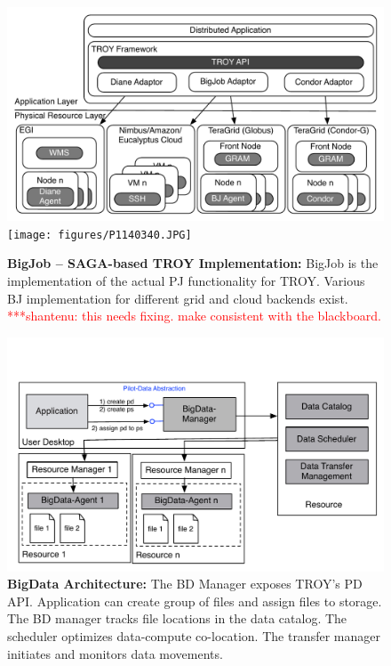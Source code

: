 \documentclass[conference,final]{IEEEtran}
\newcommand{\jhanote}[1]{ {\textcolor{red} { ***shantenu: #1 }}}
\newcommand{\jhanote}[1]{}
\newcommand{\up}{\vspace*{-1em}}
\begin{document}
\begin{figure}[t]
  \up\up\up
	\begin{minipage}[t]{0.475\linewidth}
	\centering
	\includegraphics[width=\textwidth]{figures/distributed_pilot_job.pdf}
	\texttt{[image: figures/P1140340.JPG]}
	\caption{\textbf{BigJob -- SAGA-based TROY Implementation:}
          BigJob is the implementation of the actual PJ functionality
          for TROY. Various BJ implementation for different grid and
          cloud backends exist. \jhanote{this needs fixing. make
            consistent with the blackboard.}}
	\label{fig:figures_distributed_pilot_job}
	\end{minipage}
	\hspace{0.035\linewidth}
	\begin{minipage}[t]{0.475\linewidth}
	\centering
   	\includegraphics[width=\textwidth]{figures/pilot-data-manager.pdf}
    \caption{\textbf{BigData Architecture:} The BD Manager exposes
      TROY's PD API. Application can create group of files and assign 
      files to storage. The BD manager tracks file locations in
      the data catalog. The scheduler optimizes data-compute co-location.
      The transfer manager initiates and monitors data movements. \up\up}
	\label{fig:pilot-data-architecture}
	\end{minipage}
\end{figure}
\end{document}
